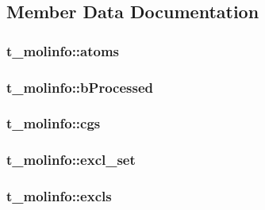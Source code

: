 \subsection{\-Member \-Data \-Documentation}
\hypertarget{structt__molinfo_aa830383e8592a00f3fae34fee91aa05a}{
\subsubsection[{atoms}]{ {\bf t\-\_\-molinfo\-::atoms}}}\label{structt__molinfo_aa830383e8592a00f3fae34fee91aa05a}
\hypertarget{structt__molinfo_adf14b2b3cdf1016ab48adea7cc31c6e1}{
\subsubsection[{b\-Processed}]{ {\bf t\-\_\-molinfo\-::b\-Processed}}}\label{structt__molinfo_adf14b2b3cdf1016ab48adea7cc31c6e1}
\hypertarget{structt__molinfo_abae971d0139995725a28a759695581da}{
\subsubsection[{cgs}]{ {\bf t\-\_\-molinfo\-::cgs}}}\label{structt__molinfo_abae971d0139995725a28a759695581da}
\hypertarget{structt__molinfo_ac41fa62a699da4ba6eadeecf820318ad}{
\subsubsection[{excl\-\_\-set}]{ {\bf t\-\_\-molinfo\-::excl\-\_\-set}}}\label{structt__molinfo_ac41fa62a699da4ba6eadeecf820318ad}
\hypertarget{structt__molinfo_a1a2dd3364b8fe496d57f35adfb9cc7d3}{
\subsubsection[{excls}]{ {\bf t\-\_\-molinfo\-::excls}}}\label{structt__molinfo_a1a2dd3364b8fe496d57f35adfb9cc7d3}
